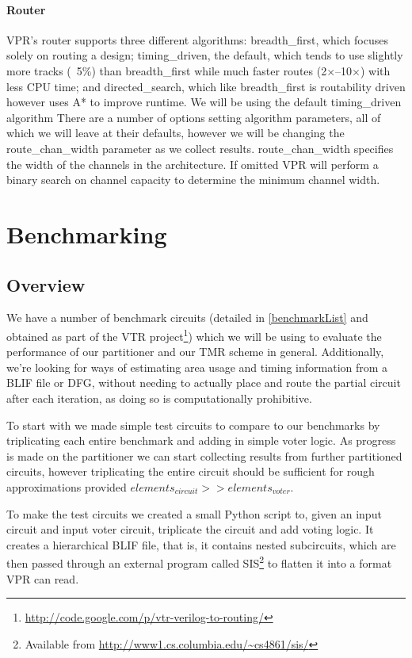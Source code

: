 \documentclass[12pt,drafta4paper,oneside]{memoir} %
\begin{document}
\subsubsection{Router}
\ac{VPR}'s router supports three different algorithms: breadth\_first, which focuses solely on routing a design; timing\_driven, the default, which tends to use slightly more tracks (~5\%) than breadth\_first while much faster routes (2$\times$--10$\times$) with less CPU time; and directed\_search, which like breadth\_first is routability driven however uses A* to improve runtime. We will be using the default timing\_driven algorithm 
There are a number of options setting algorithm parameters, all of which we will leave at their defaults, however we will be changing the route\_chan\_width parameter as we collect results. route\_chan\_width specifies the width of the channels in the architecture. If omitted \ac{VPR} will perform a binary search on channel capacity to determine the minimum channel width.

\chapter{Benchmarking}
\section{Overview}
We have a number of benchmark circuits (detailed in \ref{benchmarkList} and obtained as part of the \ac{VTR} project\footnote{\url{http://code.google.com/p/vtr-verilog-to-routing/}}) which we will be using to evaluate the performance of our partitioner and our \ac{TMR} scheme in general.
Additionally, we're looking for ways of estimating area usage and timing information from a \ac{BLIF} file or \ac{DFG}, without needing to actually place and route the partial circuit after each iteration, as doing so is computationally prohibitive.

To start with we made simple test circuits to compare to our benchmarks by triplicating each entire benchmark and adding in simple voter logic. As progress is made on the partitioner we can start collecting results from further partitioned circuits, however triplicating the entire circuit should be sufficient for rough approximations provided $elements_{circuit} >> elements_{voter}$.

To make the test circuits we created a small Python script to, given an input circuit and input voter circuit, triplicate the circuit and add voting logic. It creates a hierarchical \ac{BLIF} file, that is, it contains nested subcircuits, which are then passed through an external program called \ac{SIS}\footnote{Available from \url{http://www1.cs.columbia.edu/~cs4861/sis/}} to flatten it into a format \ac{VPR} can read.
\end{document}
